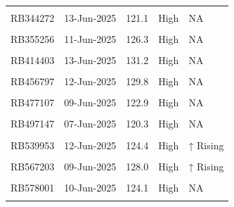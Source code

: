 \documentclass[
]{article}
\begin{document}
\begin{table}[!h]
\begin{tabular}[t]{lcccl}
\cellcolor{gray!10}{RB331216} & \cellcolor{gray!10}{10-Jun-2025} & \cellcolor{gray!10}{133.4} & \cellcolor{gray!10}{High} & \cellcolor{gray!10}{NA}\\
RB344272 & 13-Jun-2025 & 121.1 & High & NA\\
\cellcolor{gray!10}{RB350844} & \cellcolor{gray!10}{07-Jun-2025} & \cellcolor{gray!10}{123.5} & \cellcolor{gray!10}{High} & \cellcolor{gray!10}{NA}\\
RB355256 & 11-Jun-2025 & 126.3 & High & NA\\
\addlinespace
\cellcolor{gray!10}{RB355875} & \cellcolor{gray!10}{11-Jun-2025} & \cellcolor{gray!10}{122.7} & \cellcolor{gray!10}{High} & \cellcolor{gray!10}{NA}\\
RB414403 & 13-Jun-2025 & 131.2 & High & NA\\
\cellcolor{gray!10}{RB439547} & \cellcolor{gray!10}{07-Jun-2025} & \cellcolor{gray!10}{124.6} & \cellcolor{gray!10}{High} & \cellcolor{gray!10}{↑ Rising}\\
RB456797 & 12-Jun-2025 & 129.8 & High & NA\\
\cellcolor{gray!10}{RB473714} & \cellcolor{gray!10}{08-Jun-2025} & \cellcolor{gray!10}{121.5} & \cellcolor{gray!10}{High} & \cellcolor{gray!10}{↓ Falling}\\
\addlinespace
RB477107 & 09-Jun-2025 & 122.9 & High & NA\\
\cellcolor{gray!10}{RB489894} & \cellcolor{gray!10}{11-Jun-2025} & \cellcolor{gray!10}{123.8} & \cellcolor{gray!10}{High} & \cellcolor{gray!10}{↓ Falling}\\
RB497147 & 07-Jun-2025 & 120.3 & High & NA\\
\cellcolor{gray!10}{RB515474} & \cellcolor{gray!10}{11-Jun-2025} & \cellcolor{gray!10}{122.7} & \cellcolor{gray!10}{High} & \cellcolor{gray!10}{NA}\\
RB539953 & 12-Jun-2025 & 124.4 & High & ↑ Rising\\
\addlinespace
\cellcolor{gray!10}{RB540899} & \cellcolor{gray!10}{08-Jun-2025} & \cellcolor{gray!10}{128.0} & \cellcolor{gray!10}{High} & \cellcolor{gray!10}{NA}\\
RB567203 & 09-Jun-2025 & 128.0 & High & ↑ Rising\\
\cellcolor{gray!10}{RB569096} & \cellcolor{gray!10}{08-Jun-2025} & \cellcolor{gray!10}{127.0} & \cellcolor{gray!10}{High} & \cellcolor{gray!10}{NA}\\
RB578001 & 10-Jun-2025 & 124.1 & High & NA\\
\cellcolor{gray!10}{RB580563} & \cellcolor{gray!10}{09-Jun-2025} & \cellcolor{gray!10}{127.0} & \cellcolor{gray!10}{High} & \cellcolor{gray!10}{NA}\\

\end{tabular}
\end{table}
\end{document}
